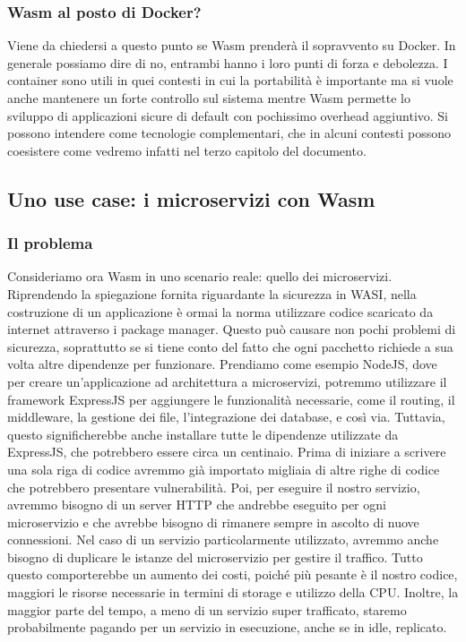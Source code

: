\subsubsection{Wasm al posto di Docker?}
Viene da chiedersi a questo punto se Wasm prenderà il sopravvento su Docker\cite{why-containers-and-wasm}. In generale possiamo dire di no, entrambi
hanno i loro punti di forza e debolezza. I container sono utili in quei contesti in cui la portabilità è importante ma
si vuole anche mantenere un forte controllo sul sistema mentre Wasm permette lo sviluppo di applicazioni sicure di
default con pochissimo overhead aggiuntivo. Si possono intendere come tecnologie complementari, che in alcuni contesti
possono coesistere come vedremo infatti nel terzo capitolo del documento.

\subsection{Uno use case: i microservizi con Wasm}
\subsubsection{Il problema}
Consideriamo ora Wasm in uno scenario reale: quello dei microservizi\cite{a-way-to-rethink-microservices}. Riprendendo
la spiegazione fornita riguardante la sicurezza in WASI, nella costruzione di un applicazione è ormai la norma
utilizzare codice scaricato da internet attraverso i package manager. Questo può causare non pochi problemi di
sicurezza, soprattutto se si tiene conto del fatto che ogni pacchetto richiede a sua volta altre dipendenze per
funzionare. Prendiamo come esempio NodeJS, dove per creare un'applicazione ad architettura a microservizi, potremmo
utilizzare il framework ExpressJS per aggiungere le funzionalità necessarie, come il routing, il middleware, la gestione
dei file, l'integrazione dei database, e così via. Tuttavia, questo significherebbe anche installare tutte le dipendenze
utilizzate da ExpressJS, che potrebbero essere circa un centinaio. Prima di iniziare a scrivere una sola riga di codice
avremmo già importato migliaia di altre righe di codice che potrebbero presentare vulnerabilità. Poi, per eseguire il
nostro servizio, avremmo bisogno di un server HTTP che andrebbe eseguito per ogni microservizio e che avrebbe bisogno di
rimanere sempre in ascolto di nuove connessioni. Nel caso di un servizio particolarmente utilizzato, avremmo anche
bisogno di duplicare le istanze del microservizio per gestire il traffico. Tutto questo comporterebbe un aumento dei
costi, poiché più pesante è il nostro codice, maggiori le risorse necessarie in termini di storage e utilizzo della CPU.
Inoltre, la maggior parte del tempo, a meno di un servizio super trafficato, staremo probabilmente pagando per un
servizio in esecuzione, anche se in idle, replicato.

